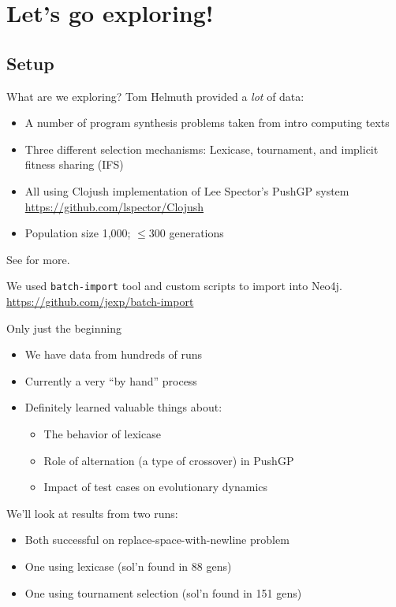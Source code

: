 \documentclass{beamer}
\newcommand{\linespace}{\vskip 0.25cm}
\begin{document}
\section{Let's go exploring!}

\subsection{Setup}

\begin{frame}{What are we exploring?}
Tom Helmuth provided a \emph{lot} of data:
\begin{itemize}
	\item A number of program synthesis problems taken from intro computing texts
	\item Three different selection mechanisms: Lexicase, tournament, and implicit fitness sharing (IFS)
	\item All using Clojush implementation of Lee Spector's PushGP system \url{https://github.com/lspector/Clojush}
	\item Population size 1,000; $\leq 300$ generations
\end{itemize}
See \cite{Helmuth:GECCO15} for more.

\linespace

We used \texttt{batch-import} tool and custom scripts to import into Neo4j. 
{\tiny \url{https://github.com/jexp/batch-import}} 
\end{frame}

\begin{frame}{Only just the beginning}
	\begin{itemize}
		\item We have data from hundreds of runs
		\item Currently a very ``by hand'' process
		\item Definitely learned valuable things about:
		\begin{itemize}
			\item The behavior of lexicase
			\item Role of alternation (a type of crossover) in PushGP
			\item Impact of test cases on evolutionary dynamics
		\end{itemize}
	\end{itemize}
	
	\linespace
	
	We'll look at results from two runs:
	\begin{itemize}
		\item Both successful on replace-space-with-newline problem
		\item One using lexicase (sol'n found in 88 gens)
		\item One using tournament selection (sol'n found in 151 gens)
	\end{itemize}
\end{frame}
\end{document}

